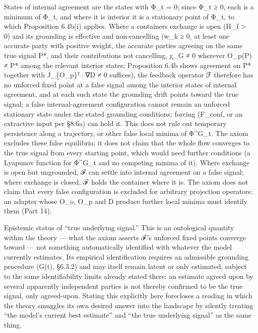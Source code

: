 \documentclass[
]{article}
\begin{document}
States of internal agreement are the states with Φ\_t = 0; since Φ\_t ≥
0, each is a minimum of Φ\_t, and where it is interior it is a
stationary point of Φ\_t, to which Proposition 6.4b(i) applies. Where a
container\textquotesingle s exchange is open (Π\_f \textgreater{} 0) and
its grounding is effective and non-cancelling (w\_k ≥ 0, at least one
accurate party with positive weight, the accurate parties agreeing on
the same true signal P*, and their contributions not cancelling, g\_G ≠
0 wherever O\_p(P) ≠ P* among the relevant interior states; Proposition
6.4b shows agreement on P* together with J\_\{O\_p\}ᵀ·∇D ≠ 0 suffices),
the feedback operator ℱ therefore has no unforced fixed point at a false
signal among the interior states of internal agreement, and at each such
state the grounding drift points toward the true signal; a false
internal-agreement configuration cannot remain an unforced stationary
state under the stated grounding conditions; forcing (F\_conf, or an
extractive input per §8.6a) can hold it. This does not rule out
temporary persistence along a trajectory, or other false local minima of
Φ\^{}G\_t. The axiom excludes these false equilibria; it does not claim
that the whole flow converges to the true signal from every starting
point, which would need further conditions (a Lyapunov function for
Φ\^{}G\_t and no competing minima of it). Where exchange is open but
ungrounded, ℱ can settle into internal agreement on a false signal;
where exchange is closed, ℱ holds the container where it is. The axiom
does not claim that every false configuration is excluded for arbitrary
projection operators: an adapter whose O\_o, O\_p and D produce further
local minima must identify them (Part 14).

Epistemic status of ``true underlying signal.'' This is an ontological
quantity within the theory --- what the axiom asserts ℱ's unforced fixed
points converge toward --- not something automatically identified with
whatever the model currently estimates. Its empirical identification
requires an admissible grounding procedure (G(t), §6.3.2) and may itself
remain latent or only estimated, subject to the same identifiability
limits already stated there: an estimate agreed upon by several
apparently independent parties is not thereby confirmed to be the true
signal, only agreed-upon. Stating this explicitly here forecloses a
reading in which the theory smuggles its own desired answer into the
landscape by silently treating ``the model's current best estimate'' and
``the true underlying signal'' as the same thing.
\end{document}
